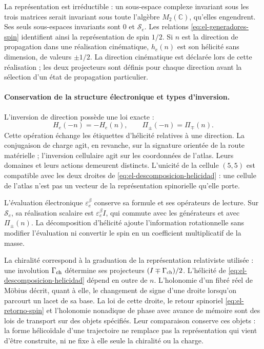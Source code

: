 La représentation est irréductible : un sous-espace complexe invariant sous
les trois matrices serait invariant sous toute l'algèbre \(M_2(\mathbb C)\),
qu'elles engendrent. Ses seuls sous-espaces invariants sont \(0\) et
\(\mathscr S_e\). Les relations
\eqref{eq:el-generadores-spin} identifient ainsi la représentation de
spin \(1/2\). Si \(n\) est la direction de propagation dans une
réalisation cinématique, \(h_e(n)\) est son hélicité sans dimension, de
valeurs \(\pm1/2\). La direction cinématique est déclarée lors de cette
réalisation ; les deux projecteurs sont définis pour chaque direction
avant la sélection d'un état de propagation particulier.

\paragraph{Conservation de la structure électronique et types d'inversion.}
L'inversion de direction possède une loi exacte :
\[
 H_e(-n)=-H_e(n),\qquad \Pi_\pm(-n)=\Pi_\mp(n).
\]
Cette opération échange les étiquettes d'hélicité relatives à une
direction. La conjugaison de charge agit, en revanche, sur la signature
orientée de la route matérielle ; l'inversion cellulaire agit sur les
coordonnées de l'atlas. Leurs domaines et leurs actions demeurent distincts.
L'unicité de la cellule \((5,5)\) est compatible avec les deux droites de
\eqref{eq:el-descomposicion-helicidad} : une cellule de l'atlas n'est pas un
vecteur de la représentation spinorielle qu'elle porte.

L'évaluation électronique \(\varepsilon_e^\beta\) conserve sa
formule et ses opérateurs de lecture. Sur \(\mathscr S_e\), sa réalisation scalaire
est \(\varepsilon_e^\beta I\), qui commute avec les générateurs et avec
\(\Pi_\pm(n)\). La décomposition d'hélicité ajoute l'information
rotationnelle sans modifier l'évaluation ni convertir le spin en un
coefficient multiplicatif de la masse.

La chiralité correspond à la graduation de la représentation relativiste
utilisée : une involution \(\Gamma_{\rm ch}\) détermine ses
projecteurs \((I\mp\Gamma_{\rm ch})/2\). L'hélicité de
\eqref{eq:el-descomposicion-helicidad} dépend en outre de \(n\).
L'holonomie d'un fibré réel de Möbius décrit, quant à elle, le changement
de signe d'une droite lorsqu'on parcourt un lacet de sa base. La loi de cette droite,
le retour spinoriel \eqref{eq:el-retorno-spin} et l'holonomie nonadique
de phase avec avance de mémoire sont des lois de transport sur des objets
spécifiés. Leur comparaison conserve ces objets : la forme hélicoïdale
d'une trajectoire ne remplace pas la représentation qui vient d'être
construite, ni ne fixe à elle seule la chiralité ou la charge.
